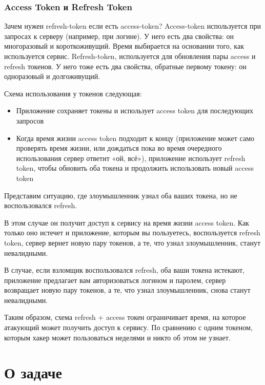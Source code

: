 \documentclass[14pt, a4paper]{diplom}
\begin{document}
\subsection{Access Token и Refresh Token}

Зачем нужен refresh-token если есть access-token?  
Access-token используется при запросах к серверу (например, при логине). У него есть два свойства: он многоразовый и короткоживущий. Время выбирается на основании того, как используется сервис. 
Refresh-token, используется для обновления пары access и refresh токенов. У него тоже есть два свойства, обратные первому токену: он одноразовый и долгоживущий.

Схема использования у токенов следующая:

\begin{itemize}
   логинится в приложении, передавая логин и пароль на сервер. Они не сохраняются на устройстве, а сервер возвращает два токена и время их жизни
  \item Приложение сохраняет токены и использует access token для последующих запросов
  \item Когда время жизни access token подходит к концу (приложение может само проверять время жизни, или дождаться пока во время очередного использования сервер ответит «ой, всё»), приложение использует refresh token, чтобы обновить оба токена и продолжить использовать новый access token
\end{itemize}

Представим ситуацию, где злоумышленник узнал оба ваших токена, но не воспользовался refresh.

В этом случае он получит доступ к сервису на время жизни access token. Как только оно истечет и приложение, которым вы пользуетесь, воспользуется refresh token, сервер вернет новую пару токенов, а те, что узнал злоумышленник, станут невалидными.

В случае, если взломщик воспользовался refresh, оба ваши токена истекают, приложение предлагает вам авторизоваться логином и паролем, сервер возвращает новую пару токенов, а те, что узнал злоумышленник, снова станут невалидными.

Таким образом, схема refresh + access токен ограничивает время, на которое атакующий может получить доступ к сервису. По сравнению с одним токеном, которым хакер может пользоваться неделями и никто об этом не узнает.
\chapter{О задаче}
\end{document}
